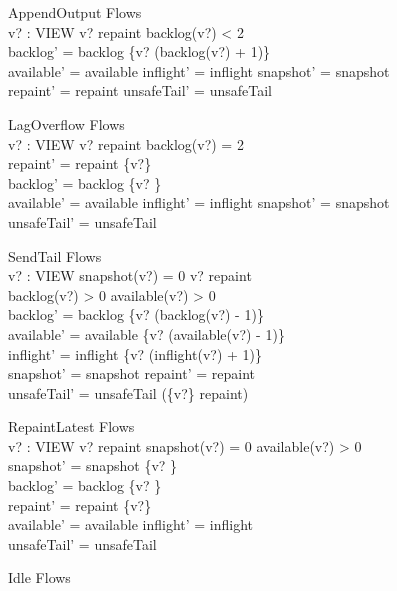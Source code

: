 \documentclass[a4paper,10pt]{article}
\begin{document}
\begin{schema}{AppendOutput}
\Delta Flows \\
v? : VIEW
\where
v? \notin repaint \land backlog(v?) < 2 \\
backlog' = backlog \oplus \{v? \mapsto (backlog(v?) + 1)\} \\
available' = available \land inflight' = inflight \land snapshot' = snapshot \\
repaint' = repaint \land unsafeTail' = unsafeTail
\end{schema}
\begin{schema}{LagOverflow}
\Delta Flows \\
v? : VIEW
\where
v? \notin repaint \land backlog(v?) = 2 \\
repaint' = repaint \cup \{v?\} \\
backlog' = backlog \oplus \{v? \} \\
available' = available \land inflight' = inflight \land snapshot' = snapshot \\
unsafeTail' = unsafeTail
\end{schema}
\begin{schema}{SendTail}
\Delta Flows \\
v? : VIEW
\where
snapshot(v?) = 0 \land v? \notin repaint \\
backlog(v?) > 0 \land available(v?) > 0 \\
backlog' = backlog \oplus \{v? \mapsto (backlog(v?) - 1)\} \\
available' = available \oplus \{v? \mapsto (available(v?) - 1)\} \\
inflight' = inflight \oplus \{v? \mapsto (inflight(v?) + 1)\} \\
snapshot' = snapshot \land repaint' = repaint \\
unsafeTail' = unsafeTail \cup (\{v?\} \cap repaint)
\end{schema}
\begin{schema}{RepaintLatest}
\Delta Flows \\
v? : VIEW
\where
v? \in repaint \land snapshot(v?) = 0 \land available(v?) > 0 \\
snapshot' = snapshot \oplus \{v? \} \\
backlog' = backlog \oplus \{v? \} \\
repaint' = repaint \setminus \{v?\} \\
available' = available \land inflight' = inflight \\
unsafeTail' = unsafeTail
\end{schema}
\begin{schema}{Idle}
\Xi Flows
\end{schema}
\end{document}
